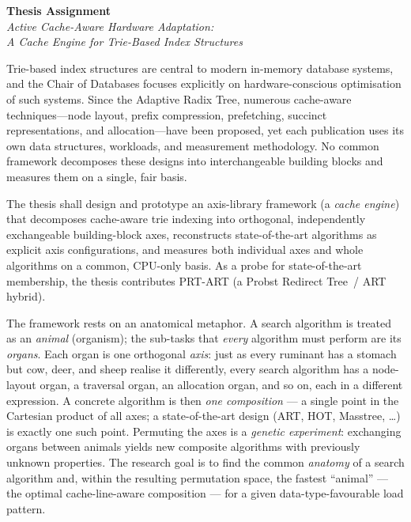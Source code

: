 {\large\textbf{Thesis Assignment}}\\[0.4em]
{\itshape Active Cache-Aware Hardware Adaptation:\\ A Cache Engine for Trie-Based Index Structures}

\bigskip
{}
Trie-based index structures are central to modern in-memory database systems,
and the Chair of Databases focuses explicitly on hardware-conscious optimisation
of such systems. Since the Adaptive Radix Tree, numerous cache-aware
techniques---node layout, prefix compression, prefetching, succinct
representations, and allocation---have been proposed, yet each publication uses
its own data structures, workloads, and measurement methodology. No common
framework decomposes these designs into interchangeable building blocks and
measures them on a single, fair basis.

The thesis shall design and prototype an axis-library framework (a
\emph{cache engine}) that decomposes cache-aware trie indexing into orthogonal,
independently exchangeable building-block axes, reconstructs state-of-the-art
algorithms as explicit axis configurations, and measures both individual axes
and whole algorithms on a common, CPU-only basis. As a probe for
state-of-the-art membership, the thesis contributes \mbox{PRT-ART} (a Probst
Redirect Tree~/ ART hybrid).

The framework rests on an anatomical metaphor. A search algorithm is treated as
an \emph{animal} (organism); the sub-tasks that \emph{every} algorithm must
perform are its \emph{organs}. Each organ is one orthogonal \emph{axis}: just as
every ruminant has a stomach but cow, deer, and sheep realise it differently,
every search algorithm has a node-layout organ, a traversal organ, an allocation
organ, and so on, each in a different expression. A concrete algorithm is then
\emph{one composition} --- a single point in the Cartesian product of all axes;
a state-of-the-art design (ART, HOT, Masstree, \ldots) is exactly one such
point. Permuting the axes is a \emph{genetic experiment}: exchanging organs
between animals yields new composite algorithms with previously unknown
properties. The research goal is to find the common \emph{anatomy} of a search
algorithm and, within the resulting permutation space, the fastest ``animal''
--- the optimal cache-line-aware composition --- for a given data-type-favourable
load pattern.

